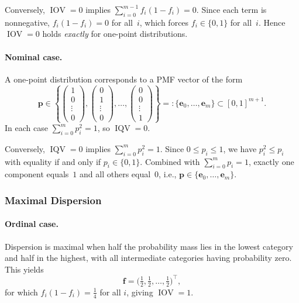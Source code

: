 \documentclass[12pt,a4paper]{scrreprt}
\DeclareMathOperator{\IOV}{IOV}
\DeclareMathOperator{\IQV}{IQV}
\begin{document}
Conversely, $\IOV = 0$ implies $\sum_{i=0}^{m-1} f_i(1-f_i) = 0$. Since each term is
nonnegative, $f_i(1-f_i) = 0$ for all~$i$, which forces $f_i \in \{0,1\}$ for all~$i$.
Hence $\IOV = 0$ holds \emph{exactly} for one-point distributions.

\paragraph{Nominal case.}
A one-point distribution corresponds to a PMF vector of the form
\[
    \mathbf{p} \in
    \left\{
    \begin{pmatrix} 1 \\ 0 \\ \vdots \\ 0 \end{pmatrix},
    \begin{pmatrix} 0 \\ 1 \\ \vdots \\ 0 \end{pmatrix},
    \ldots,
    \begin{pmatrix} 0 \\ 0 \\ \vdots \\ 1 \end{pmatrix}
    \right\}
    =: \{\mathbf{e}_0,\ldots,\mathbf{e}_m\} \subset [0,1]^{m+1}.
\]
In each case $\sum_{i=0}^m p_i^2 = 1$, so $\IQV = 0$.

Conversely, $\IQV = 0$ implies $\sum_{i=0}^m p_i^2 = 1$. Since $0 \leq p_i \leq 1$, we have
$p_i^2 \leq p_i$ with equality if and only if $p_i \in \{0,1\}$. Combined with
$\sum_{i=0}^m p_i = 1$, exactly one component equals~$1$ and all others equal~$0$, i.e.,
$\mathbf{p} \in \{\mathbf{e}_0,\ldots,\mathbf{e}_m\}$.

\subsubsection{Maximal Dispersion}

\paragraph{Ordinal case.}
Dispersion is maximal when half the probability mass lies in the lowest category and half in
the highest, with all intermediate categories having probability zero. This yields
\[
    \mathbf{f} = \bigl(\tfrac{1}{2}, \tfrac{1}{2}, \ldots, \tfrac{1}{2}\bigr)^{\top},
\]
for which $f_i(1-f_i) = \tfrac{1}{4}$ for all $i$, giving $\IOV = 1$.
\end{document}

